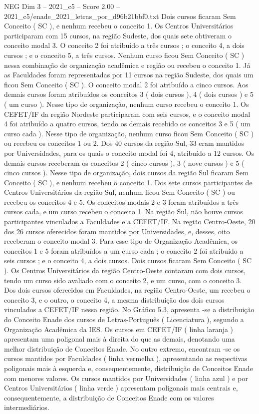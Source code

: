 \begin{textsample}{NEG Dim 3 – 2021\_c5 – Score 2.00 – 2021\_c5/enade\_2021\_letras\_por\_d96b21bbf0.txt}
Dois cursos ficaram Sem Conceito ( SC ), e nenhum recebeu o conceito 1.
Os Centros Universitários participaram com 15 cursos, na região Sudeste, dos quais sete obtiveram o conceito modal 3.
O conceito 2 foi atribuído a três cursos ; o conceito 4, a dois cursos ; e o conceito 5, a três cursos.
Nenhum curso ficou Sem Conceito ( SC ) nessa combinação de organização acadêmica e região ou recebeu o conceito 1.
Já as Faculdades foram representadas por 11 cursos na região Sudeste, dos quais um ficou Sem Conceito ( SC ).
O conceito modal 2 foi atribuído a cinco cursos.
Aos demais cursos foram atribuídos os conceitos 3 ( dois cursos ), 4 ( dois cursos ) e 5 ( um curso ).
Nesse tipo de organização, nenhum curso recebeu o conceito 1.
Os CEFET/IF da região Nordeste participaram com seis cursos, e o conceito modal 4 foi atribuído a quatro cursos, tendo os demais recebido os conceitos 3 e 5 ( um curso cada ).
Nesse tipo de organização, nenhum curso ficou Sem Conceito ( SC ) ou recebeu os conceitos 1 ou 2.
Dos 40 cursos da região Sul, 33 eram mantidos por Universidades, para os quais o conceito modal foi 4, atribuído a 12 cursos.
Os demais cursos receberam os conceitos 2 ( cinco cursos ), 3 ( nove cursos ) e 5 ( cinco cursos ).
Nesse tipo de organização, dois cursos da região Sul ficaram Sem Conceito ( SC ), e nenhum recebeu o conceito 1.
Dos sete cursos participantes de Centros Universitários da região Sul, nenhum ficou Sem Conceito ( SC ) ou recebeu os conceitos 4 e 5.
Os conceitos modais 2 e 3 foram atribuídos a três cursos cada, e um curso recebeu o conceito 1.
Na região Sul, não houve cursos participantes vinculados a Faculdades e a CEFET/IF.
Na região Centro-Oeste, 20 dos 26 cursos oferecidos foram mantidos por Universidades, e, desses, oito receberam o conceito modal 3.
Para esse tipo de Organização Acadêmica, os conceitos 1 e 5 foram atribuídos a um curso cada ; o conceito 2 foi atribuído a seis cursos ; e o conceito 4, a dois cursos.
Dois cursos ficaram Sem Conceito ( SC ).
Os Centros Universitários da região Centro-Oeste contaram com dois cursos, tendo um curso sido avaliado com o conceito 2, e um curso, com o conceito 3.
Dos dois cursos oferecidos em Faculdades, na região Centro-Oeste, um recebeu o conceito 3, e o outro, o conceito 4, a mesma distribuição dos dois cursos vinculados a CEFET/IF nessa região.
No Gráfico 5.3, apresenta -se a distribuição do Conceito Enade dos cursos de Letras-Português ( Licenciatura ), segundo a Organização Acadêmica da IES.
Os cursos em CEFET/IF ( linha laranja ) apresentam uma poligonal mais à direita do que as demais, denotando uma melhor distribuição de Conceitos Enade.
No outro extremo, encontram -se os cursos mantidos por Faculdades ( linha vermelha ), apresentando as respectivas poligonais mais à esquerda e, consequentemente, distribuição de Conceitos Enade com menores valores.
Os cursos mantidos por Universidades ( linha azul ) e por Centros Universitários ( linha verde ) apresentam poligonais mais centrais e, consequentemente, a distribuição de Conceitos Enade com os valores intermediários.

\end{textsample}
